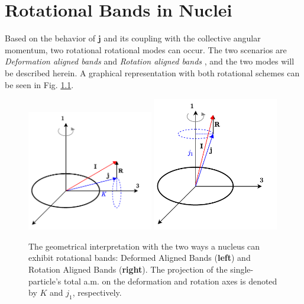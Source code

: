 \chapter{Rotational Bands in Nuclei}
\label{appendix:ral-dal-signature-scheme}

Based on the behavior of $\mathbf{j}$ and its coupling with the collective angular momentum, two rotational rotational modes can occur. The two scenarios are \emph{Deformation aligned bands} and \emph{Rotation aligned bands} \cite{uwitonze2015assignment}, and the two modes will be described herein. A graphical representation with both rotational schemes can be seen in Fig. \ref{ral-dal-coupling-bands}.
\begin{figure}
    \centering
    \includegraphics[width=0.49\textwidth]{Chapters/Figures/DAL_scheme.pdf}
    \includegraphics[width=0.49\textwidth]{Chapters/Figures/RAL_scheme.pdf}
    \caption{The geometrical interpretation with the two ways a nucleus can exhibit rotational bands: Deformed Aligned Bands (\textbf{left}) and Rotation Aligned Bands (\textbf{right}). The projection of the single-particle's total a.m. on the deformation and rotation axes is denoted by $K$ and $j_1$, respectively.}
    \label{ral-dal-coupling-bands}
\end{figure}

